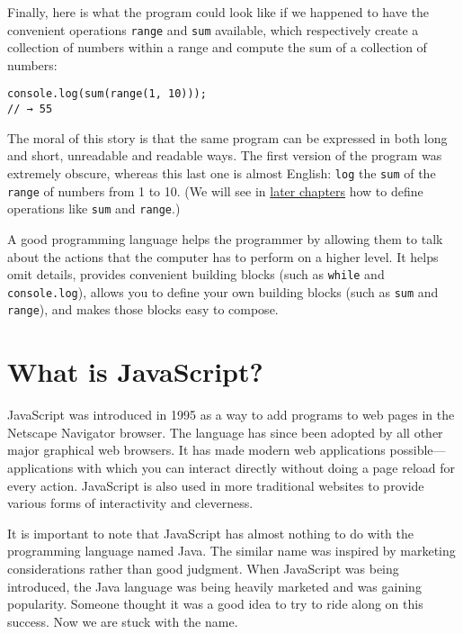 Finally, here is what the program could look like if we happened to have the convenient operations \lstinline`range` and \lstinline`sum` available, which respectively create a collection of numbers within a range and compute the sum of a collection of numbers:

\begin{lstlisting}
console.log(sum(range(1, 10)));
// → 55
\end{lstlisting}
\noindent{}

The moral of this story is that the same program can be expressed in both long and short, unreadable and readable ways. The first version of the program was extremely obscure, whereas this last one is almost English: \lstinline`log` the \lstinline`sum` of the \lstinline`range` of numbers from 1 to 10. (We will see in \hyperref[data]{later chapters} how to define operations like \lstinline`sum` and \lstinline`range`.)

A good programming language helps the programmer by allowing them to talk about the actions that the computer has to perform on a higher level. It helps omit details, provides convenient building blocks (such as \lstinline`while` and \lstinline`console.log`), allows you to define your own building blocks (such as \lstinline`sum` and \lstinline`range`), and makes those blocks easy to compose.

\section{What is JavaScript?}

JavaScript was introduced in 1995 as a way to add programs to web pages in the Netscape Navigator browser. The language has since been adopted by all other major graphical web browsers. It has made modern web applications possible—applications with which you can interact directly without doing a page reload for every action. JavaScript is also used in more traditional websites to provide various forms of interactivity and cleverness.

It is important to note that JavaScript has almost nothing to do with the programming language named Java. The similar name was inspired by marketing considerations rather than good judgment. When JavaScript was being introduced, the Java language was being heavily marketed and was gaining popularity. Someone thought it was a good idea to try to ride along on this success. Now we are stuck with the name.

